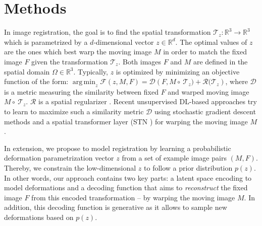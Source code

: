 \documentclass[journal]{IEEEtran}
\DeclareMathOperator*{\argmin}{arg\,min}
\begin{document}
\section{Methods}
In image registration, the goal is to find the spatial transformation $\mathcal{T}_z:\mathbb{R}^3\rightarrow\mathbb{R}^3$ which is parametrized by a $d$-dimensional vector $z\in\mathbb{R}^d$. The optimal values of $z$ are the ones which best warp the moving image $M$ in order to match the fixed image $F$ given the transformation $\mathcal{T}_z$. Both images $F$ and $M$ are defined in the spatial domain $\Omega\in\mathbb{R}^3$. Typically, $z$ is optimized by minimizing an objective function of the form: $\argmin_z  \mathcal{F}(z,M,F)= \mathcal{D}\left(F,M \circ\ \mathcal{T}_z) + \mathcal{R}(\mathcal{T}_z\right)$, where $\mathcal{D}$ is a metric measuring the similarity between fixed $F$ and warped moving image $M \circ\ \mathcal{T}_z$. $\mathcal{R}$ is a spatial regularizer \cite{sotiras}. Recent unsupervised DL-based approaches \cite{jason2016back,de2017end,balakrishnan2018unsupervised} try to learn to maximize such a similarity metric $\mathcal{D}$ using stochastic gradient descent methods and a spatial transformer layer (STN \cite{jaderberg2015spatial}) for warping the moving image $M$. 

In extension, we propose to model registration by learning a probabilistic deformation parametrization vector $z$ from a set of example image pairs $(M, F)$. Thereby, we constrain the low-dimensional $z$ to follow a prior distribution $p(z)$. In other words, our approach contains two key parts: a latent space encoding to model deformations and a decoding function that aims to \emph{reconstruct} the fixed image $F$ from this encoded transformation -- by warping the moving image $M$. In addition, this decoding function is generative as it allows to sample new deformations based on $p(z)$.
\end{document}
